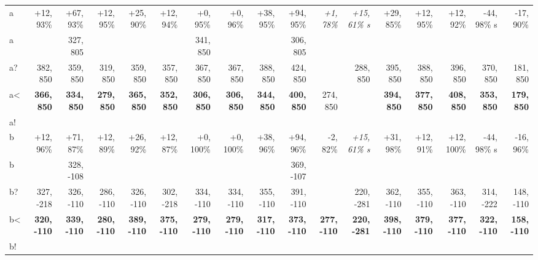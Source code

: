 \begin{table}[p]
{\begin{tabular}{lrrrrrrrrrrrrrrrr}
a~ & +12, 93\% & +67, 93\% & +12, 95\% & +25, 90\% & +12, 94\% & +0, 95\% & +0, 96\% & +38, 95\% & +94, 95\% & \textit{+1, 78\%} & \textit{+15, 61\% s} & +29, 85\% & +12, 95\% & +12, 92\% & -44, 98\% s & -17, 90\% \\
a &  & 327, 805 &  &  &  & 341, 850 &  &  & 306, 805 &  &  &  &  &  &  &  \\
a? & 382, 850 & 359, 850 & 319, 850 & 359, 850 & 357, 850 & 367, 850 & 367, 850 & 388, 850 & 424, 850 &  & 288, 850 & 395, 850 & 388, 850 & 396, 850 & 370, 850 & 181, 850 \\
a< & \textbf{366, 850} & \textbf{334, 850} & \textbf{279, 850} & \textbf{365, 850} & \textbf{352, 850} & \textbf{306, 850} & \textbf{306, 850} & \textbf{344, 850} & \textbf{400, 850} & 274, 850 &  & \textbf{394, 850} & \textbf{377, 850} & \textbf{408, 850} & \textbf{353, 850} & \textbf{179, 850} \\
a! &  &  &  &  &  &  &  &  &  &  &  &  &  &  &  &  \\
b~ & +12, 96\% & +71, 87\% & +12, 89\% & +26, 92\% & +12, 87\% & +0, 100\% & +0, 100\% & +38, 96\% & +94, 96\% & -2, 82\% & \textit{+15, 61\% s} & +31, 98\% & +12, 91\% & +12, 100\% & -44, 98\% s & -16, 96\% \\
b &  & 328, -108 &  &  &  &  &  &  & 369, -107 &  &  &  &  &  &  &  \\
b? & 327, -218 & 326, -110 & 286, -110 & 326, -110 & 302, -218 & 334, -110 & 334, -110 & 355, -110 & 391, -110 &  & 220, -281 & 362, -110 & 355, -110 & 363, -110 & 314, -222 & 148, -110 \\
b< & \textbf{320, -110} & \textbf{339, -110} & \textbf{280, -110} & \textbf{389, -110} & \textbf{375, -110} & \textbf{279, -110} & \textbf{279, -110} & \textbf{317, -110} & \textbf{373, -110} & \textbf{277, -110} & \textbf{220, -281} & \textbf{398, -110} & \textbf{379, -110} & \textbf{377, -110} & \textbf{322, -110} & \textbf{158, -110} \\
b! &  &  &  &  &  &  &  &  &  &  &  &  &  &  &  &  \\

\end{tabular}
}
\end{table}
\clearpage


